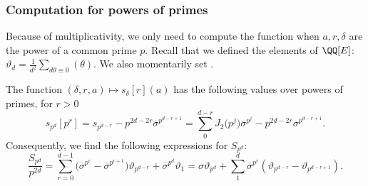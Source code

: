 \subsubsection{Computation for powers of primes} Because of multiplicativity, we only need to compute the function when $a,r,\delta$ are the power of a common prime $p$. Recall that we defined the elements of $\QQ[E]$: $\vartheta_d=\frac{1}{d^2}\sum_{d\theta\equiv 0}(\theta)$. We also momentarily set .


\begin{prop}\label{prop-expression-powers-primes}
 The function $(\delta,r,a)\mapsto s_\delta[r](a)$ has the following values over powers of primes, for $r>0$
 \[ s_{p^d}[p^r]=s_{p^{d-r}}-p^{2d-2r}\overline{\sigma}^{p^{d-r+1}} = \sum_0^{d-r} J_2\bigl(p^j\bigr)\overline{\sigma}^{p^j} -p^{2d-2r}\overline{\sigma}^{p^{d-r+1}} . \]
 Consequently, we find the following expressions for $S_{p^d}$:
 \[ \frac{S_{p^d}}{p^{2d}} = \sum_{r=0}^{d-1} \bigl(\overline{\sigma}^{p^r}-\overline{\sigma}^{p^{r+1}}\bigr)\vartheta_{p^{d-r}} + \overline{\sigma}^{p^d}\vartheta_1
 = \sigma\vartheta_{p^d} + \sum_1^d \overline{\sigma}^{p^r} (\vartheta_{p^{d-r}}-\vartheta_{p^{d-r+1}}). \]

\end{prop}

